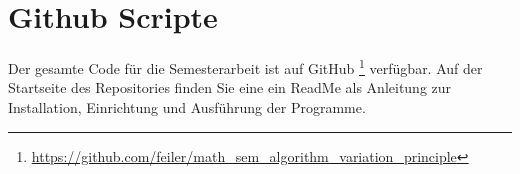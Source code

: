 %
%
%
%
\section{Github Scripte
\label{buch:paper:varalg:section:github_scripte}}

Der gesamte Code für die Semesterarbeit ist auf GitHub 
\footnote{\url{https://github.com/feiler/math_sem_algorithm_variation_principle}}
\cite{algorythm:repo} verfügbar. 
Auf der Startseite des Repositories finden Sie eine ein ReadMe als Anleitung zur 
Installation, Einrichtung und Ausführung der Programme.